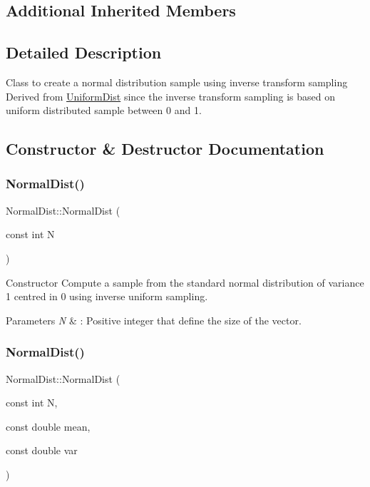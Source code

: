 \subsection*{Additional Inherited Members}


\subsection{Detailed Description}
Class to create a normal distribution sample using inverse transform sampling Derived from \hyperlink{classUniformDist}{Uniform\+Dist} since the inverse transform sampling is based on uniform distributed sample between 0 and 1. 

\subsection{Constructor \& Destructor Documentation}
\mbox{\label{classNormalDist_acafd80c0e98d85ecac3acce4b7919b41}} 
\subsubsection{\texorpdfstring{Normal\+Dist()}{NormalDist()}\hspace{0.1cm}{\footnotesize\ttfamily [1/2]}}
{\footnotesize\ttfamily Normal\+Dist\+::\+Normal\+Dist (\begin{DoxyParamCaption}\item[{const int}]{N }\end{DoxyParamCaption})}



Constructor Compute a sample from the standard normal distribution of variance 1 centred in 0 using inverse uniform sampling. 


\begin{DoxyParams}{Parameters}
{\em N} & \+: Positive integer that define the size of the vector. \\
\hline
\end{DoxyParams}
\mbox{\label{classNormalDist_ab26a2a8829a69838c683d3197420a672}} 
\subsubsection{\texorpdfstring{Normal\+Dist()}{NormalDist()}\hspace{0.1cm}{\footnotesize\ttfamily [2/2]}}
{\footnotesize\ttfamily Normal\+Dist\+::\+Normal\+Dist (\begin{DoxyParamCaption}\item[{const int}]{N,  }\item[{const double}]{mean,  }\item[{const double}]{var }\end{DoxyParamCaption})}



